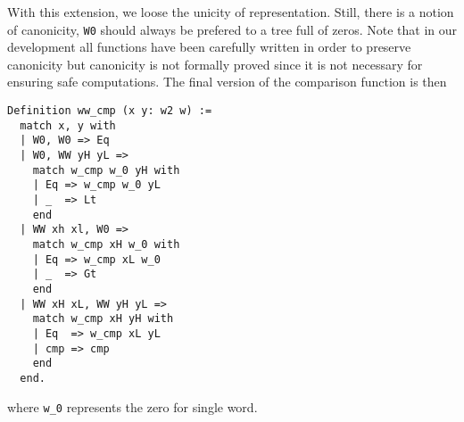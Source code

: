 With this extension, we loose the unicity of representation. Still, there is a notion
of canonicity, {\tt W0} should always be prefered to a tree full of zeros. Note that in
our development all functions have been carefully written in order to preserve canonicity but
canonicity  is not formally proved since it is not necessary for ensuring safe computations.
The final version of the comparison function is then
\begin{verbatim}
Definition ww_cmp (x y: w2 w) :=
  match x, y with
  | W0, W0 => Eq
  | W0, WW yH yL =>
    match w_cmp w_0 yH with
    | Eq => w_cmp w_0 yL
    | _  => Lt
    end
  | WW xh xl, W0 =>
    match w_cmp xH w_0 with
    | Eq => w_cmp xL w_0
    | _  => Gt
    end
  | WW xH xL, WW yH yL =>
    match w_cmp xH yH with
    | Eq  => w_cmp xL yL
    | cmp => cmp
    end
  end.
\end{verbatim}
where {\tt w\_0} represents the zero for single word.


